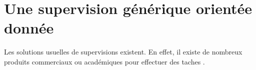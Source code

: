 \section{Une supervision générique orientée donnée}
Les solutions usuelles de supervisions existent. En effet, il existe de nombreux produits commerciaux ou académiques pour effectuer des taches .